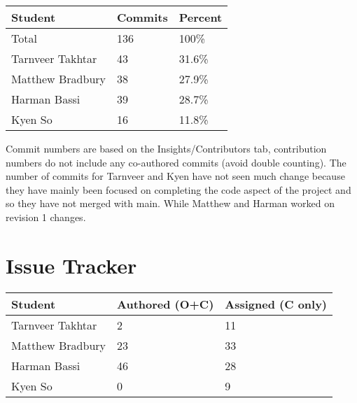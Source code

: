 \documentclass{article}
\begin{document}
\begin{table}[H]
    \centering
    \begin{tabular}{lll}
    \toprule
    \textbf{Student} & \textbf{Commits} & \textbf{Percent}\\
    \midrule
    Total & 136 & 100\% \\
    Tarnveer Takhtar & 43 & 31.6\%\\
    Matthew Bradbury & 38 & 27.9\%\\
    Harman Bassi & 39 & 28.7\%\\
    Kyen So & 16 & 11.8\%\\
    \bottomrule
    \end{tabular}
    \end{table}

Commit numbers are based on the Insights/Contributors tab, contribution numbers do not include any co-authored commits (avoid double counting).
The number of commits for Tarnveer and Kyen have not seen much change because they have mainly been focused on completing the code aspect of the project 
and so they have not merged with main. While Matthew and Harman worked on revision 1 changes.

\section{Issue Tracker}

\begin{table}[H]
\centering
\begin{tabular}{lll}
\toprule
\textbf{Student} & \textbf{Authored (O+C)} & \textbf{Assigned (C only)}\\
\midrule
Tarnveer Takhtar & 2 & 11\\
Matthew Bradbury & 23 & 33\\
Harman Bassi & 46 & 28\\
Kyen So & 0 & 9\\
\bottomrule
\end{tabular}
\end{table}
\end{document}
